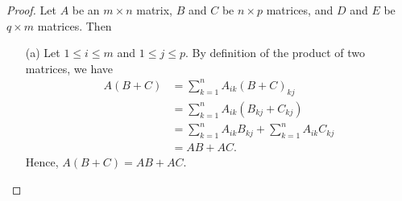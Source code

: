 \begin{proof}
    Let \( A  \) be an \( m \times n  \) matrix, \( B  \) and \(  C  \) be \( n \times p  \) matrices, and \( D  \) and \( E  \) be \( q \times  m  \) matrices. Then
\begin{enumerate}
    \item[(a)] Let \( 1 \leq i \leq m  \) and \( 1 \leq j \leq p  \). By definition of the product of two matrices, we have 
        \begin{align*}
        A(B+C) &= \sum_{ k=1 }^{ n } {A}_{ik } {(B+C)}_{kj} \\ 
               &= \sum_{ k=1 }^{ n } {A}_{ik } ({B}_{kj} + {C}_{kj} ) \\
               &= \sum_{ k=1 }^{ n } {A}_{ik } {B}_{kj} + \sum_{ k=1 }^{ n } {A}_{ik} {C}_{kj} \\ 
               &= AB + AC.    
        \end{align*}
        Hence, \( A(B+C) = AB + AC  \).
        

\end{enumerate}
\end{proof}
